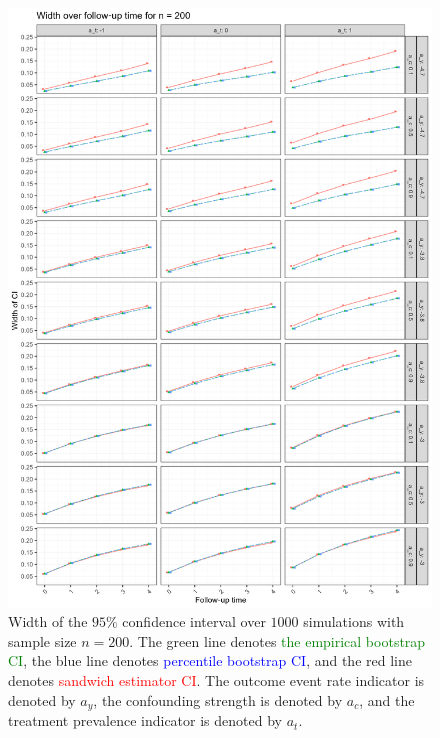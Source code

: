 \documentclass[pdflatex,sn-vancouver-ay]{sn-jnl}%
\theoremstyle{thmstyleone}%
\theoremstyle{thmstyletwo}%
\theoremstyle{thmstylethree}%
\begin{document}
\begin{appendices}
\begin{figure}[H]
\centering
\includegraphics[height=0.95\textheight]{plots/plots_width200.png}
\caption{Width of the $95\%$ confidence interval over $1000$ simulations with sample size $n = 200$. The green line denotes \textcolor{green}{the empirical bootstrap CI}, the blue line denotes \textcolor{blue}{percentile bootstrap CI}, and the red line denotes \textcolor{red}{sandwich estimator CI}. The outcome event rate indicator is denoted by $a_y$, the confounding strength is denoted by $a_c$, and the treatment prevalence indicator is denoted by $a_t$.}\label{plt:width200}
\end{figure}

\newpage


\end{appendices}
\end{document}
